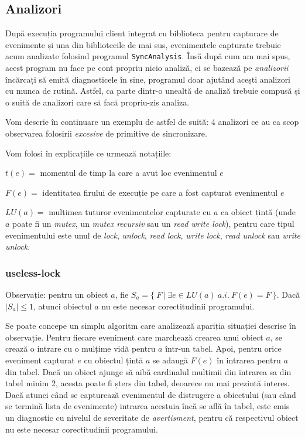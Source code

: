 \subsection{Analizori}\label{analyzers}

După execuția programului client integrat cu biblioteca pentru capturare
de evenimente și una din bibliotecile de mai sus, evenimentele capturate
trebuie acum analizate folosind programul \lstinline{SyncAnalysis}. Însă
după cum am mai spus, acest program nu face pe cont propriu nicio
analiză, ci se bazează pe \textit{analizorii} încărcați să emită
diagnosticele în sine, programul doar ajutând acești analizori cu munca
de rutină. Astfel, ca parte dintr-o unealtă de analiză trebuie compusă
și o suită de analizori care să facă propriu-zis analiza.

Vom descrie în continuare un exemplu de astfel de suită: 4 analizori ce
au ca scop observarea folosirii \textit{excesive} de primitive de
sincronizare.

Vom folosi în explicațiile ce urmează notațiile:

$t(e)=$ momentul de timp la care a avut loc evenimentul $e$

$F(e)=$ identitatea firului de execuție pe care a fost capturat
evenimentul $e$

$LU(a)=$ mulțimea tuturor evenimentelor capturate cu $a$ ca obiect țintă
(unde $a$ poate fi un \textit{mutex}, un \textit{mutex recursiv} sau un
\textit{read write lock}), pentru care tipul evenimentului este unul de
\textit{lock}, \textit{unlock}, \textit{read lock}, \textit{write lock},
\textit{read unlock} sau \textit{write unlock}.

\subsubsection{useless-lock}

Observație: pentru un obiect $a$, fie
$S_a = \{\ F\ |\ \exists e \in LU(a) \ a.i.\ F(e) = F\ \}$. Dacă
$|S_a| \leq 1$, atunci obiectul $a$ nu este necesar corectitudinii
programului.

Se poate concepe un simplu algoritm care analizează apariția situației
descrise în observație. Pentru fiecare eveniment care marchează crearea
unui obiect $a$, se crează o intrare cu o mulțime vidă pentru $a$
într-un tabel. Apoi, pentru orice eveniment capturat $e$ cu obiectul
țintă $a$ se adaugă $F(e)$ în intrarea pentru $a$ din tabel. Dacă un
obiect ajunge să aibă cardinalul mulțimii din intrarea sa din tabel
minim 2, acesta poate fi șters din tabel, deoarece nu mai prezintă
interes. Dacă atunci când se capturează evenimentul de distrugere a
obiectului (sau când se termină lista de evenimente) intrarea acestuia
încă se află în tabel, este emis un diagnostic cu nivelul de severitate
de \textit{avertisment}, pentru că respectivul obiect nu este necesar
corectitudinii programului.

